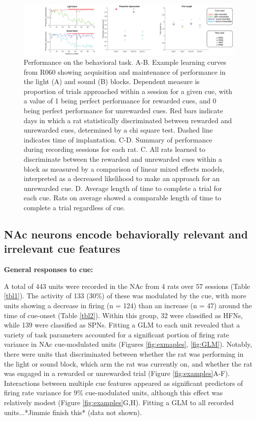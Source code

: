 \documentclass[11pt]{article}
\begin{document}
\begin{figure}[h]
\centering
\includegraphics[width=\textwidth]{Fig 4 - Behavioral results.png}
\caption{Performance on the behavioral task. A-B. Example learning curves from R060 showing acquisition and maintenance of performance in the light (A) and sound (B) blocks. Dependent measure is proportion of trials approached within a session for a given cue, with a value of 1 being perfect performance for rewarded cues, and 0 being perfect performance for unrewarded cues. Red bars indicate days in which a rat statistically discriminated between rewarded and unrewarded cues, determined by a chi square test. Dashed line indicates time of implantation. C-D. Summary of performance during recording sessions for each rat. C. All rats learned to discriminate between the rewarded and unrewarded cues within a block as measured by a comparison of linear mixed effects models, interpreted as a decreased likelihood to make an approach for an unrewarded cue. D. Average length of time to complete a trial for each cue. Rats on average showed a comparable length of time to complete a trial regardless of cue.}
\label{fig:behav}
\end{figure}

\subsection*{NAc neurons encode behaviorally relevant and irrelevant cue features}

{\bf General responses to cue:}

A total of 443 units were recorded in the NAc from 4 rats over 57 sessions (Table \ref{tbl1}). The activity of 133 (30\%) of these was modulated by the cue, with more units showing a decrease in firing (n = 124) than an increase (n = 47) around the time of cue-onset (Table \ref{tbl2}). Within this group, 32 were classified as HFNs, while 139 were classified as SPNs. Fitting a GLM to each unit revealed that a variety of task parameters accounted for a significant portion of firing rate variance in NAc cue-modulated units (Figures \ref{fig:exmaples}, \ref{fig:GLM}). Notably, there were units that discriminated between whether the rat was performing in the light or sound block, which arm the rat was currently on, and whether the rat was engaged in a rewarded or unrewarded trial (Figure \ref{fig:examples}A-F). Interactions between multiple cue features appeared as significant predictors of firing rate variance for 9\% cue-modulated units, although this effect was relatively modest (Figure \ref{fig:examples}G,H). Fitting a GLM to all recorded units...*Jimmie finish this* (data not shown).
\end{document}
